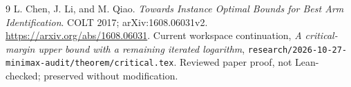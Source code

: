 \begin{thebibliography}{9}
 L. Chen, J. Li, and M. Qiao.
\emph{Towards Instance Optimal Bounds for Best Arm Identification}.
COLT 2017; arXiv:1608.06031v2.
\url{https://arxiv.org/abs/1608.06031}.
 Current workspace continuation,
\emph{A critical-margin upper bound with a remaining iterated logarithm},
\texttt{research/\allowbreak{}2026-10-27-minimax-audit/\allowbreak{}theorem/\allowbreak{}critical.tex}.
Reviewed paper proof, not Lean-checked; preserved without modification.
\end{thebibliography}
